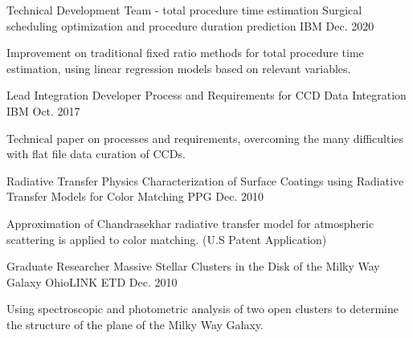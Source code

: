 

\begin{cventries}

  \cventry
    {Technical Development Team - total procedure time estimation} %
    {Surgical scheduling optimization and procedure duration prediction} %
    {IBM} %
    {Dec. 2020} %
    {
      \begin{cvitems} %
        \item {Improvement on traditional fixed ratio methods for total procedure time estimation, using linear regression models based on relevant variables.}
      \end{cvitems}
    }

  \cventry
    {Lead Integration Developer} %
    {Process and Requirements for CCD Data Integration} %
    {IBM} %
    {Oct. 2017} %
    {
      \begin{cvitems} %
        \item {Technical paper on processes and requirements, overcoming the many difficulties with flat file data curation of CCDs.}
      \end{cvitems}
    }

  \cventry
    {Radiative Transfer Physics} %
    {Characterization of Surface Coatings using Radiative Transfer Models for Color Matching} %
    {PPG} %
    {Dec. 2010} %
    {
      \begin{cvitems} %
        \item {Approximation of Chandrasekhar radiative transfer model for atmospheric scattering is applied to color matching.  (U.S Patent Application)}
      \end{cvitems}
    }

  \cventry
    {Graduate Researcher} %
    {Massive Stellar Clusters in the Disk of the Milky Way Galaxy} %
    {OhioLINK ETD} %
    {Dec. 2010} %
    {
      \begin{cvitems} %
        \item {Using spectroscopic and photometric analysis of two open clusters to determine the structure of the plane of the Milky Way Galaxy.}
      \end{cvitems}
    }


\end{cventries}
